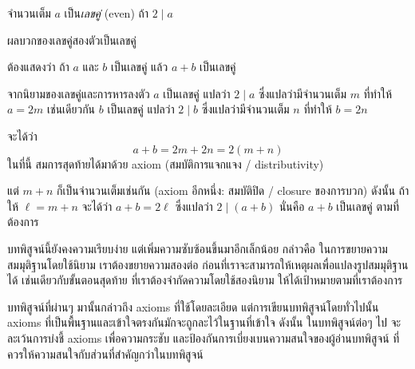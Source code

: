 \begin{definition}
จำนวนเต็ม $a$ เป็น\emph{เลขคู่} (even) ถ้า $2\mid a$
\end{definition}

\begin{theorem}
ผลบวกของเลขคู่สองตัวเป็นเลขคู่

\begin{pf}
ต้องแสดงว่า ถ้า $a$ และ $b$ เป็นเลขคู่ แล้ว $a+b$ เป็นเลขคู่

จากนิยามของเลขคู่และการหารลงตัว $a$ เป็นเลขคู่ แปลว่า $2\mid a$ ซึ่งแปลว่ามีจำนวนเต็ม $m$ ที่ทำให้ $a=2m$ เช่นเดียวกัน $b$ เป็นเลขคู่ แปลว่า $2\mid b$ ซึ่งแปลว่ามีจำนวนเต็ม $n$ ที่ทำให้ $b=2n$

จะได้ว่า \[a+b=2m+2n=2(m+n)\] ในที่นี้ สมการสุดท้ายได้มาด้วย axiom (สมบัติการแจกแจง / distributivity)

แต่ $m+n$ ก็เป็นจำนวนเต็มเช่นกัน (axiom อีกหนึ่ง: สมบัติปิด / closure ของการบวก) ดังนั้น ถ้าให้ $\ell=m+n$ จะได้ว่า $a+b=2\ell$ ซึ่งแปลว่า $2\mid (a+b)$ นั่นคือ $a+b$ เป็นเลขคู่ ตามที่ต้องการ
\end{pf}
\end{theorem}
บทพิสูจน์นี้ยังคงความเรียบง่าย แต่เพิ่มความซับซ้อนขึ้นมาอีกเล็กน้อย กล่าวคือ ในการขยายความสมมุติฐานโดยใช้นิยาม เราต้องขยายความสองต่อ ก่อนที่เราจะสามารถให้เหตุผลเพื่อแปลงรูปสมมุติฐานได้ เช่นเดียวกับขั้นตอนสุดท้าย ที่เราต้องจำกัดความโดยใช้สองนิยาม ให้ได้เป้าหมายตามที่เราต้องการ

บทพิสูจน์ที่ผ่านๆ มานั้นกล่าวถึง axioms ที่ใช้โดยละเอียด แต่การเขียนบทพิสูจน์โดยทั่วไปนั้น axioms ที่เป็นพื้นฐานและเข้าใจตรงกันมักจะถูกละไว้ในฐานที่เข้าใจ ดังนั้น ในบทพิสูจน์ต่อๆ ไป จะละเว้นการบ่งชี้ axioms เพื่อความกระชับ และป้องกันการเบี่ยงเบนความสนใจของผู้อ่านบทพิสูจน์ ที่ควรให้ความสนใจกับส่วนที่สำคัญกว่าในบทพิสูจน์

